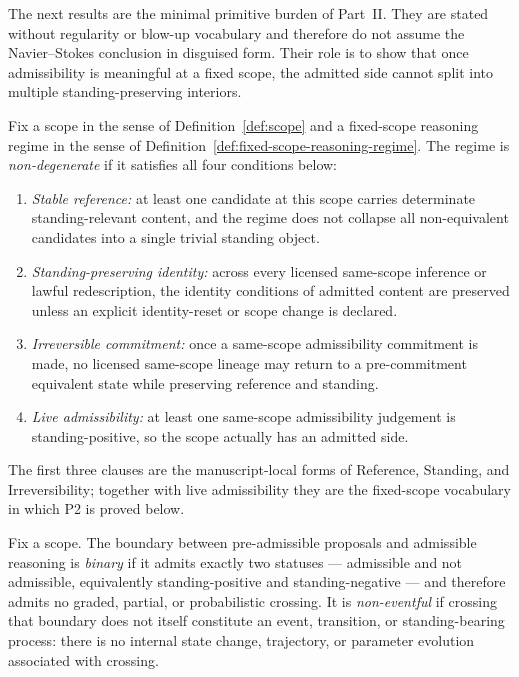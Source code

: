 The next results are the minimal primitive burden of Part~II. They are stated without regularity or blow-up vocabulary and therefore do not assume the Navier--Stokes conclusion in disguised form. Their role is to show that once admissibility is meaningful at a fixed scope, the admitted side cannot split into multiple standing-preserving interiors.

\begin{definition}\label{def:nondegenerate-fixed-scope}
Fix a scope in the sense of Definition~\ref{def:scope} and a fixed-scope reasoning regime in the sense of Definition~\ref{def:fixed-scope-reasoning-regime}. The regime is \emph{non-degenerate} if it satisfies all four conditions below:
\begin{enumerate}[label=(\roman*), leftmargin=2.2em]
\item \emph{Stable reference:} at least one candidate at this scope carries determinate standing-relevant content, and the regime does not collapse all non-equivalent candidates into a single trivial standing object.
\item \emph{Standing-preserving identity:} across every licensed same-scope inference or lawful redescription, the identity conditions of admitted content are preserved unless an explicit identity-reset or scope change is declared.
\item \emph{Irreversible commitment:} once a same-scope admissibility commitment is made, no licensed same-scope lineage may return to a pre-commitment equivalent state while preserving reference and standing.
\item \emph{Live admissibility:} at least one same-scope admissibility judgement is standing-positive, so the scope actually has an admitted side.
\end{enumerate}
The first three clauses are the manuscript-local forms of Reference, Standing, and Irreversibility; together with live admissibility they are the fixed-scope vocabulary in which P2 is proved below.
\end{definition}

\begin{definition}\label{def:binary-boundary}
Fix a scope. The boundary between pre-admissible proposals and admissible reasoning is \emph{binary} if it admits exactly two statuses --- admissible and not admissible, equivalently standing-positive and standing-negative --- and therefore admits no graded, partial, or probabilistic crossing. It is \emph{non-eventful} if crossing that boundary does not itself constitute an event, transition, or standing-bearing process: there is no internal state change, trajectory, or parameter evolution associated with crossing.
\end{definition}

